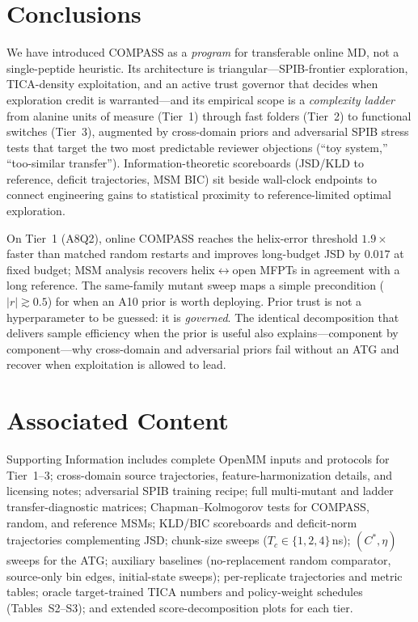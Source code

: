 \documentclass[journal=jctcce,manuscript=article,layout=twocolumn]{achemso}
\begin{document}
\section{Conclusions}

We have introduced COMPASS as a \emph{program} for transferable online MD, not a single-peptide heuristic. Its architecture is triangular---SPIB-frontier exploration, TICA-density exploitation, and an active trust governor that decides when exploration credit is warranted---and its empirical scope is a \emph{complexity ladder} from alanine units of measure (Tier~1) through fast folders (Tier~2) to functional switches (Tier~3), augmented by cross-domain priors and adversarial SPIB stress tests that target the two most predictable reviewer objections (``toy system,'' ``too-similar transfer''). Information-theoretic scoreboards (JSD/KLD to reference, deficit trajectories, MSM BIC) sit beside wall-clock endpoints to connect engineering gains to statistical proximity to reference-limited optimal exploration.

On Tier~1 (A8Q2), online COMPASS reaches the helix-error threshold $1.9\times$ faster than matched random restarts and improves long-budget JSD by $0.017$ at fixed budget; MSM analysis recovers helix$\leftrightarrow$open MFPTs in agreement with a long reference. The same-family mutant sweep maps a simple precondition ($|r|\gtrsim 0.5$) for when an A10 prior is worth deploying. Prior trust is not a hyperparameter to be guessed: it is \emph{governed}. The identical decomposition that delivers sample efficiency when the prior is useful also explains---component by component---why cross-domain and adversarial priors fail without an ATG and recover when exploitation is allowed to lead.

\section{Associated Content}

Supporting Information includes complete OpenMM inputs and protocols for Tier~1--3; cross-domain source trajectories, feature-harmonization details, and licensing notes; adversarial SPIB training recipe; full multi-mutant and ladder transfer-diagnostic matrices; Chapman--Kolmogorov tests for COMPASS, random, and reference MSMs; KLD/BIC scoreboards and deficit-norm trajectories complementing JSD; chunk-size sweeps ($T_c\in\{1,2,4\}$\,ns); $(C^*,\eta)$ sweeps for the ATG; auxiliary baselines (no-replacement random comparator, source-only bin edges, initial-state sweeps); per-replicate trajectories and metric tables; oracle target-trained TICA numbers and policy-weight schedules (Tables~S2--S3); and extended score-decomposition plots for each tier.
\end{document}
